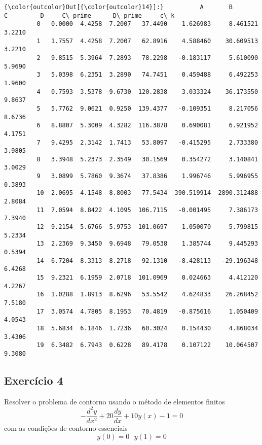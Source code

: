 \documentclass[11pt]{article}
\begin{document}
\begin{Verbatim}[commandchars=\\\{\}]
{\color{outcolor}Out[{\color{outcolor}14}]:}          A       B       C         D     C\_prime      D\_prime     c\_k
         0   0.0000  4.4258  7.2007   37.4490    1.626983     8.461521  3.2210
         1   1.7557  4.4258  7.2007   62.8916    4.588460    30.609513  3.2210
         2   9.8515  5.3964  7.2893   78.2298   -0.183117     5.610090  5.9690
         3   5.0398  6.2351  3.2890   74.7451    0.459488     6.492253  1.9600
         4   0.7593  3.5378  9.6730  120.2838    3.033324    36.173550  9.8637
         5   5.7762  9.0621  0.9250  139.4377   -0.109351     8.217056  8.6736
         6   8.8807  5.3009  4.3282  116.3878    0.690081     6.921952  4.1751
         7   9.4295  2.3142  1.7413   53.8097   -0.415295     2.733380  3.9805
         8   3.3948  5.2373  2.3549   30.1569    0.354272     3.140841  3.0029
         9   3.0899  5.7860  9.3674   37.8386    1.996746     5.996955  0.3893
         10  2.0695  4.1548  8.8003   77.5434  390.519914  2890.312488  2.8084
         11  7.0594  8.8422  4.1095  106.7115   -0.001495     7.386173  7.3940
         12  9.2154  5.6766  5.9753  101.0697    1.050070     5.799815  5.2334
         13  2.2369  9.3450  9.6948   79.0538    1.385744     9.445293  0.5394
         14  6.7204  8.3313  8.2718   92.1310   -8.428113   -29.196348  6.4268
         15  9.2321  6.1959  2.0718  101.0969    0.024663     4.412120  4.2267
         16  1.0288  1.8913  8.6296   53.5542    4.624833    26.268452  7.5180
         17  3.0574  4.7805  8.1953   70.4819   -0.875616     1.050409  4.0543
         18  5.6834  6.1846  1.7236   60.3024    0.154430     4.868034  3.4306
         19  6.3482  6.7943  0.6228   89.4178    0.107122    10.064507  9.3080
\end{Verbatim}
            
    \hypertarget{exercuxedcio-4}{%
\subsection{Exercício 4}\label{exercuxedcio-4}}

Resolver o problema de contorno usando o método de elementos finitos
\[ -\frac{d^2 y}{d x^2} + 20 \frac{dy}{dx} + 10 y(x)-1=0 \] com as
condições de contorno essenciais \[y(0)=0 \:\:\: y(1)=0\]
\end{document}
